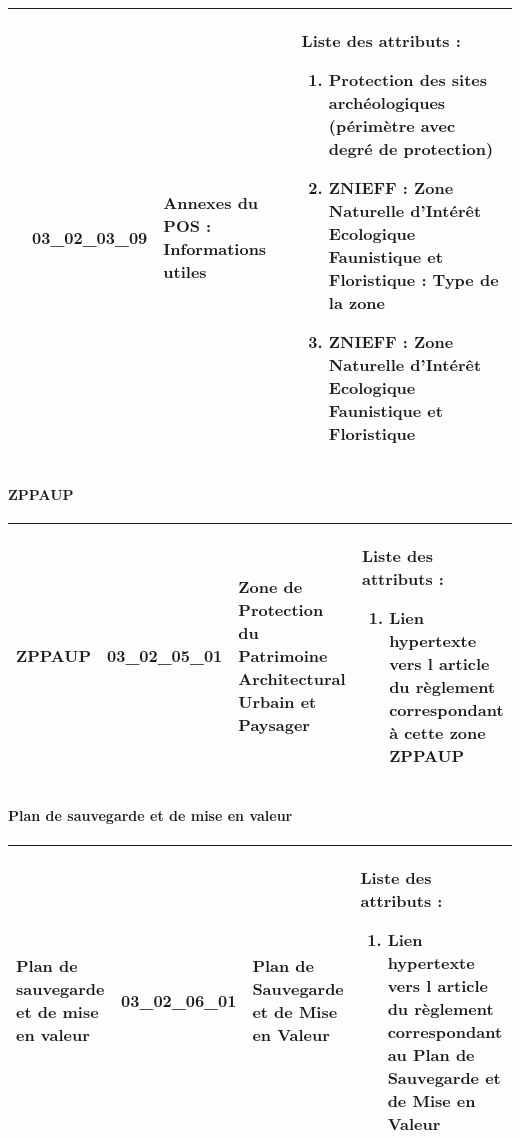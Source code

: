\documentclass[12pt,titlepage]{book}
\begin{document}
\begin{supertabular}{|p{10cm}|c|p{13cm}|p{12cm}|}
\\


                    & 03\_02\_03\_09 & Annexes du POS : Informations utiles & Liste des attributs :
\begin{enumerate}
  \item Protection des sites archéologiques (périmètre avec degré de protection)  \item ZNIEFF : Zone Naturelle d'Intérêt Ecologique Faunistique et Floristique : Type de la zone  \item ZNIEFF : Zone Naturelle d'Intérêt Ecologique Faunistique et Floristique\end{enumerate}
\\
\hline
\end{supertabular}
\begin{figure}[h!]
  \hfill         %
\end{figure}


\paragraph{ZPPAUP}
\noindent
\vspace{\baselineskip}

\renewcommand{\arraystretch}{1.2}
\begin{supertabular}{|p{10cm}|c|p{13cm}|p{12cm}|}
 ZPPAUP & 03\_02\_05\_01 & Zone de Protection du Patrimoine Architectural Urbain et Paysager & Liste des attributs :
\begin{enumerate}
  \item Lien hypertexte vers l article du règlement correspondant à cette zone ZPPAUP\end{enumerate}
\\
\hline
\end{supertabular}
\begin{figure}[h!]
  \hfill         %
\end{figure}


\paragraph{Plan de sauvegarde et de mise en valeur}
\noindent
\vspace{\baselineskip}

\renewcommand{\arraystretch}{1.2}
\begin{supertabular}{|p{10cm}|c|p{13cm}|p{12cm}|}
 Plan de sauvegarde et de mise en valeur & 03\_02\_06\_01 & Plan de Sauvegarde et de Mise en Valeur & Liste des attributs :
\begin{enumerate}
  \item Lien hypertexte vers l article du règlement correspondant au Plan de Sauvegarde et de Mise en Valeur\end{enumerate}
\\
\hline
\end{supertabular}
\begin{figure}[h!]
  \hfill         %
\end{figure}
\end{document}
